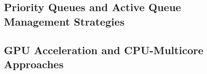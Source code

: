 \subsection{Priority Queues and Active Queue Management Strategies}\label{subsec:priority-aqm}

\subsection{GPU Acceleration and CPU-Multicore Approaches}\label{subsec:gpu-accel}





